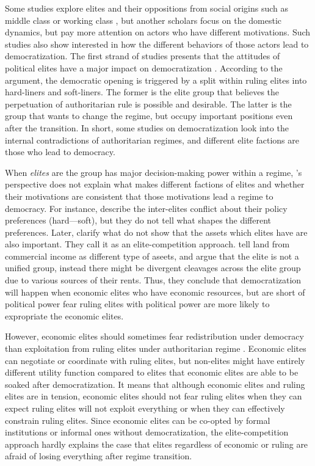 \documentclass[11pt]{article}
\begin{document}
Some studies explore elites and their oppositions from social origins such as middle class or working class \citep{Moore1966, Rueschemeyer1992}, but another scholars focus on the domestic dynamics, but pay more attention on actors who have different motivations. Such studies also show interested in how the different behaviors of those actors lead to democratization. The first strand of studies presents that the attitudes of political elites have a major impact on democratization \citep{ODonnell1986}. According to the argument, the democratic opening is triggered by a split within ruling elites into hard-liners and soft-liners. The former is the elite group that believes the perpetuation of authoritarian rule is possible and 
desirable. The latter is the group that wants to change the regime, but occupy important positions even after the transition. In short, some studies on democratization look into the internal contradictions of authoritarian regimes, and different elite factions are those who lead to democracy.

When \emph{elites} are the group has major decision-making power within a regime, \citet{ODonnell1986}'s perspective does not explain what makes different factions of elites and whether their motivations are consistent that those motivations lead a regime to democracy. For instance, \citet{ODonnell1986} describe the inter-elites conflict about their policy preferences (hard---soft), but they do not tell what shapes the different preferences. Later, \citet{Ansell2015a} clarify what \citet{ODonnell1986} do not show that the assets which elites have are also important. They call it as an elite-competition approach. \citet{Ansell2015a} tell land from commercial income as different type of aseets, and argue that the elite is not a unified group, instead there might be divergent cleavages across the elite group due to various sources of their rents. Thus, they conclude that democratization will happen when economic elites who have economic resources, but are short of political power fear ruling elites with political power are more likely to expropriate the economic elites.

However, economic elites should sometimes fear redistribution under democracy than exploitation from ruling elites under authoritarian regime \citep{Albertus2014}. Economic elites can negotiate or coordinate with ruling elites, but non-elites might have entirely different utility function compared to elites that economic elites are able to be soaked after democratization. It means that although economic elites and ruling elites are in tension, economic elites should not fear ruling elites when they can expect ruling elites will not exploit everything or when they can effectively constrain ruling elites. Since economic elites can be co-opted by formal institutions \citet{Schedler2002a, Wright2008, Gandhi2007, Gandhi2009} or informal ones without democratization, the elite-competition approach hardly explains the case that elites regardless of economic or ruling are afraid of losing everything after regime transition.
\end{document}
